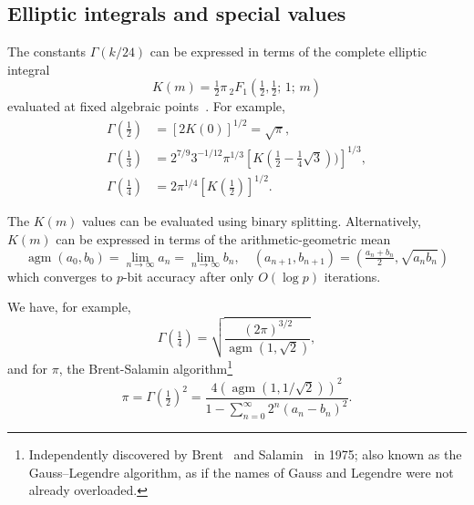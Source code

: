 \documentclass[reqno]{amsart}
\theoremstyle{definition}
\begin{document}
\subsection{Elliptic integrals and special values}

The constants $\Gamma(k/24)$ can be expressed in terms
of the complete elliptic integral
\begin{equation}
K(m) = \tfrac{1}{2} \pi \, {}_2F_1(\tfrac{1}{2}, \tfrac{1}{2}; \, 1; \, m)
\end{equation}
evaluated at fixed
algebraic points~\cite{chowla1967,BorweinZucker1992}.
For example,
\begin{align}
\Gamma(\tfrac{1}{2}) &= [2 K(0)]^{1/2} = \sqrt{\pi}, \\
\Gamma(\tfrac{1}{3}) &= 2^{7/9} 3^{-1/12} \pi^{1/3} [K(\tfrac{1}{2} - \tfrac{1}{4} \sqrt{3}))]^{1/3}, \\
\Gamma(\tfrac{1}{4}) &= 2 \pi^{1/4} [K(\tfrac{1}{2})]^{1/2}.
\end{align}

The $K(m)$ values can be evaluated using binary splitting.
Alternatively, $K(m)$ can be expressed in terms
of the arithmetic-geometric mean
\begin{equation}
\operatorname{agm}(a_0,b_0) = \lim_{n \to \infty} a_n = \lim_{n \to \infty} b_n, \quad \left(a_{n+1}, b_{n+1}\right) = \left(\tfrac{a_n+b_n}{2}, \sqrt{a_n b_n}\right)
\end{equation}
which
converges to $p$-bit accuracy after only $O(\log p)$ iterations.

We have, for example,
\begin{equation}
\Gamma(\tfrac{1}{4}) = \sqrt{\frac{(2\pi)^{3/2}}{\operatorname{agm}(1, \sqrt 2)}},
\end{equation}
and for $\pi$, the Brent-Salamin algorithm\footnote{Independently discovered by Brent~\cite{brent1976multiple} and Salamin~\cite{Salamin1976} in 1975;
also known as the Gauss–Legendre algorithm, as if the names
of Gauss and Legendre were not already overloaded.}
\begin{equation}
\pi = \Gamma(\tfrac{1}{2})^2 = \frac{4 (\operatorname{agm}(1, 1/\sqrt 2))^2}{1 - \sum_{n=0}^{\infty} 2^n (a_{n} - b_{n})^2}.
\end{equation}

%
\end{document}

